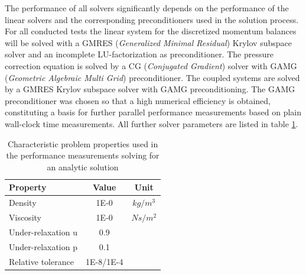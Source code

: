 The performance of all solvers significantly depends on the performance of the linear solvers and the corresponding preconditioners used in the solution process. For all conducted tests the linear system for the discretized momentum balances will be solved with a GMRES (\emph{Generalized Minimal Residual}) \cite{saad86} Krylov subspace solver and an incomplete LU-factorization as preconditioner. The pressure correction equation is solved by a CG (\emph{Conjugated Gradient}) solver \cite{hestenes52} with GAMG (\emph{Geometric Algebraic Multi Grid}) preconditioner. The coupled systems are solved by a GMRES Krylov subspace solver with GAMG preconditioning. The GAMG preconditioner was chosen so that a high numerical efficiency is obtained, constituting a basis for further parallel performance measurements based on plain wall-clock time measurements. All further solver parameters are listed in table \ref{tab:performance}.

\begin{table}[h!]\centering
{}
  \begin{tabular}{lcc}\toprule
    Property & Value & Unit \\
    \midrule
    \rowcolor{black!20} Density    & 1E-0 & $kg/m^3$      \\
    \rowcolor{black!00} Viscosity  & 1E-0 & $Ns/m^2$  \\
    \rowcolor{black!00} Under-relaxation u & 0.9 &  \\
    \rowcolor{black!20} Under-relaxation p & 0.1 &  \\
    \rowcolor{black!00} Relative tolerance & 1E-8/1E-4 &
  \end{tabular}
  \caption{Characteristic problem properties used in the performance measurements solving for an analytic solution}
  \label{tab:performance}
\end{table}
 
